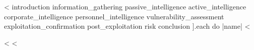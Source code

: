\documentclass[10pt, a4paper, twoside]{amsbook}
\begin{document}
  

  \tableofcontents

  \sloppy

  <%
    introduction
    information_gathering
    passive_intelligence
    active_intelligence
    corporate_intelligence
    personnel_intelligence
    vulnerability_assessment
    exploitation_confirmation
    post_exploitation
    risk
    conclusion
  ].each do |name| %
    <%
      
    <%
  <%

  \printbibliography{}
\end{document}
